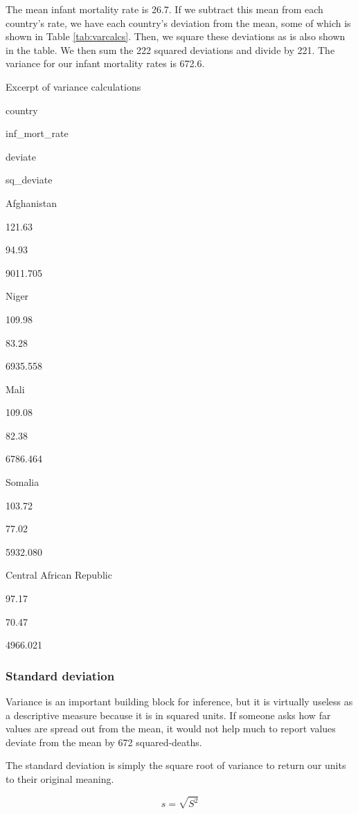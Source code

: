 \documentclass[
]{book}
\begin{document}
The mean infant mortality rate is 26.7. If we subtract this mean from each country's rate, we have each country's deviation from the mean, some of which is shown in Table \ref{tab:varcalcs}. Then, we square these deviations as is also shown in the table. We then sum the 222 squared deviations and divide by 221. The variance for our infant mortality rates is 672.6.

\label{tab:varcalcs}Excerpt of variance calculations

country

inf\_mort\_rate

deviate

sq\_deviate

Afghanistan

121.63

94.93

9011.705

Niger

109.98

83.28

6935.558

Mali

109.08

82.38

6786.464

Somalia

103.72

77.02

5932.080

Central African Republic

97.17

70.47

4966.021

\hypertarget{standard-deviation}{%
\subsubsection*{Standard deviation}\label{standard-deviation}}

Variance is an important building block for inference, but it is virtually useless as a descriptive measure because it is in squared units. If someone asks how far values are spread out from the mean, it would not help much to report values deviate from the mean by 672 squared-deaths.

The standard deviation is simply the square root of variance to return our units to their original meaning.

\begin{equation}
{\displaystyle s = \sqrt{S^2}}
\label{eq:sd}
\end{equation}
\end{document}
